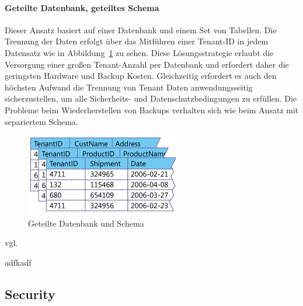\paragraph{Geteilte Datenbank, geteiltes Schema} 
Dieser Ansatz basiert auf einer Datenbank und einem Set von Tabellen. Die Trennung der Daten erfolgt über das Mitführen einer Tenant-ID in jedem Datensatz wie in Abbildung~\ref{fig:geteilteDatenbankundSchema} zu sehen. Diese Lösungsstrategie erlaubt die Versorgung einer großen Tenant-Anzahl per Datenbank und erfordert daher die geringsten Hardware und Backup Kosten. Gleichzeitig erfordert es auch den höchsten Aufwand die Trennung von Tenant Daten anwendungsseitig sicherzustellen, um alle Sicherheits- und Datenschutzbedingungen zu erfüllen. Die Probleme beim Wiederherstellen von Backups verhalten sich wie beim Ansatz mit separiertem Schema. 
\begin{figure}[h]
	\centering
	\includegraphics[width=0.5\linewidth]{images/geteilte_datenbank-geteiltes_schema}
	\caption{Geteilte Datenbank und Schema}
	\label{fig:geteilteDatenbankundSchema}
\end{figure}
vgl.

adfkadf 
\subsection{Security}

